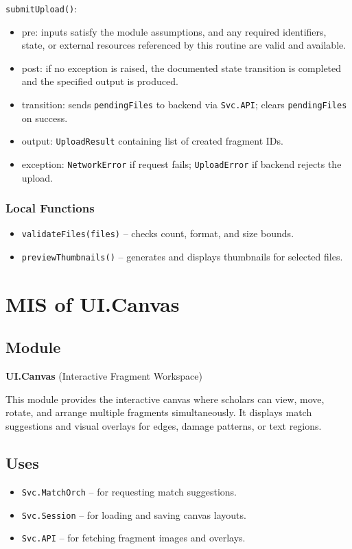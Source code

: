 \documentclass[12pt, titlepage]{article}
\begin{document}
\noindent \texttt{submitUpload()}:
\begin{itemize}
    \item pre: inputs satisfy the module assumptions, and any required identifiers, state, or external resources referenced by this routine are valid and available.
    \item post: if no exception is raised, the documented state transition is completed and the specified output is produced.
    \item transition: sends \texttt{pendingFiles} to backend via \texttt{Svc.API}; clears \texttt{pendingFiles} on success.
    \item output: \texttt{UploadResult} containing list of created fragment IDs.
    \item exception: \texttt{NetworkError} if request fails; \texttt{UploadError} if backend rejects the upload.
\end{itemize}

\subsubsection{Local Functions}
\begin{itemize}
    \item \texttt{validateFiles(files)} – checks count, format, and size bounds.
    \item \texttt{previewThumbnails()} – generates and displays thumbnails for selected files.
\end{itemize}



\section{MIS of UI.Canvas} \label{UI.Canvas}

\subsection{Module}
\textbf{UI.Canvas} \; (Interactive Fragment Workspace)

This module provides the interactive canvas where scholars can view, move, rotate, and arrange multiple fragments simultaneously. It displays match suggestions and visual overlays for edges, damage patterns, or text regions.

\subsection{Uses}
\begin{itemize}
    \item \texttt{Svc.MatchOrch} – for requesting match suggestions.
    \item \texttt{Svc.Session} – for loading and saving canvas layouts.
    \item \texttt{Svc.API} – for fetching fragment images and overlays.
\end{itemize}
\end{document}
